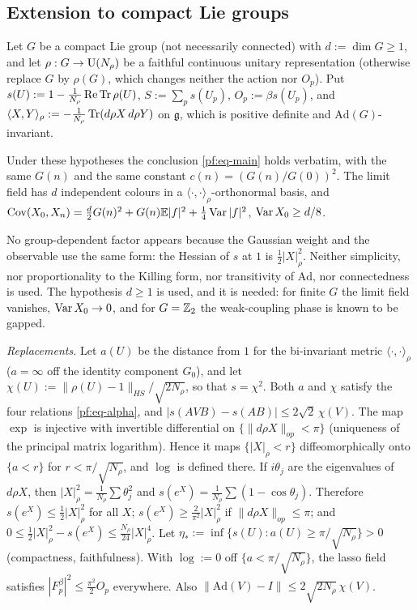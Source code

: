 \subsection{Extension to compact Lie groups}\label{gen:sec}

Let $G$ be a compact Lie group (not necessarily connected) with $d:=\dim G\ge1$, and let $\rho:G\to\mathrm{U}(N_\rho)$ be a faithful continuous unitary representation (otherwise replace $G$ by $\rho(G)$, which changes neither the action nor $O_p$). Put $s(U):=1-\frac1{N_\rho}\operatorname{Re}\operatorname{Tr}\rho(U)$, $S:=\sum_ps(U_p)$, $O_p:=\beta s(U_p)$, and $\langle X,Y\rangle_\rho:=-\frac1{N_\rho}\operatorname{Tr}(d\rho X\,d\rho Y)$ on $\mathfrak g$, which is positive definite and $\mathrm{Ad}(G)$-invariant.

\begin{theorem}\label{gen:thm}
Under these hypotheses the conclusion \eqref{pf:eq-main} holds verbatim, with the same $G(n)$ and the same constant $c(n)=(G(n)/G(0))^2$. The limit field has $d$ independent colours in a $\langle\cdot,\cdot\rangle_\rho$-orthonormal basis, and $\operatorname{Cov}(X_0,X_n)=\frac d2G(n)^2+G(n)\mathbb{E}|f|^2+\frac14\operatorname{Var}|f|^2$, $\operatorname{Var} X_0\ge d/8$.
\end{theorem}

No group-dependent factor appears because the Gaussian weight and the observable use the same form: the Hessian of $s$ at $1$ is $\frac12|X|_\rho^2$. Neither simplicity, nor proportionality to the Killing form, nor transitivity of $\mathrm{Ad}$, nor connectedness is used. The hypothesis $d\ge1$ is used, and it is needed: for finite $G$ the limit field vanishes, $\operatorname{Var} X_0\to0$, and for $G=\mathbb{Z}_2$ the weak-coupling phase is known to be gapped.

\emph{Replacements.} Let $a(U)$ be the distance from $1$ for the bi-invariant metric $\langle\cdot,\cdot\rangle_\rho$ ($a=\infty$ off the identity component $G_0$), and let $\chi(U):=\|\rho(U)-1\|_{HS}/\sqrt{2N_\rho}$, so that $s=\chi^2$. Both $a$ and $\chi$ satisfy the four relations \eqref{pf:eq-alpha}, and $|s(AVB)-s(AB)|\le2\sqrt2\,\chi(V)$. The map $\exp$ is injective with invertible differential on $\{\|d\rho X\|_{op}<\pi\}$ (uniqueness of the principal matrix logarithm). Hence it maps $\{|X|_\rho<r\}$ diffeomorphically onto $\{a<r\}$ for $r<\pi/\sqrt{N_\rho}$, and $\log$ is defined there. If $i\theta_j$ are the eigenvalues of $d\rho X$, then $|X|_\rho^2=\frac1{N_\rho}\sum\theta_j^2$ and $s(e^X)=\frac1{N_\rho}\sum(1-\cos\theta_j)$. Therefore $s(e^X)\le\frac12|X|_\rho^2$ for all $X$; $s(e^X)\ge\frac2{\pi^2}|X|_\rho^2$ if $\|d\rho X\|_{op}\le\pi$; and $0\le\frac12|X|^2_\rho-s(e^X)\le\frac{N_\rho}{24}|X|_\rho^4$. Let $\eta_*:=\inf\{s(U):a(U)\ge\pi/\sqrt{N_\rho}\}>0$ (compactness, faithfulness). With $\log:=0$ off $\{a<\pi/\sqrt{N_\rho}\}$, the lasso field satisfies $|F^\beta_p|^2\le\frac{\pi^2}2O_p$ everywhere. Also $\|\mathrm{Ad}(V)-I\|\le2\sqrt{2N_\rho}\,\chi(V)$.

